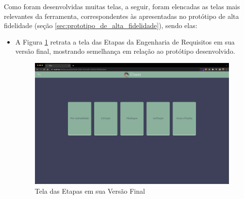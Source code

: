 Como foram desenvolvidas muitas telas, a seguir, foram elencadas as telas mais relevantes da ferramenta, correspondentes às apresentadas no protótipo de alta fidelidade (seção \ref{sec:prototipo_de_alta_fidelidade}), sendo elas:

\begin{itemize}
    \item A Figura \ref{fig:etapas_implementado} retrata a tela das Etapas da Engenharia de Requisitos em sua versão final, mostrando semelhança em relação ao protótipo desenvolvido.
    \begin{figure}[]
      \begin{center}
          \caption{{Tela das Etapas em sua Versão Final}}
          \label{fig:etapas_implementado}
          \includegraphics[scale=0.22]{figuras/TelasDesenvolvidas/etapas-implementado.png}
    \end{center}
    \end{figure}
    

\end{itemize}
